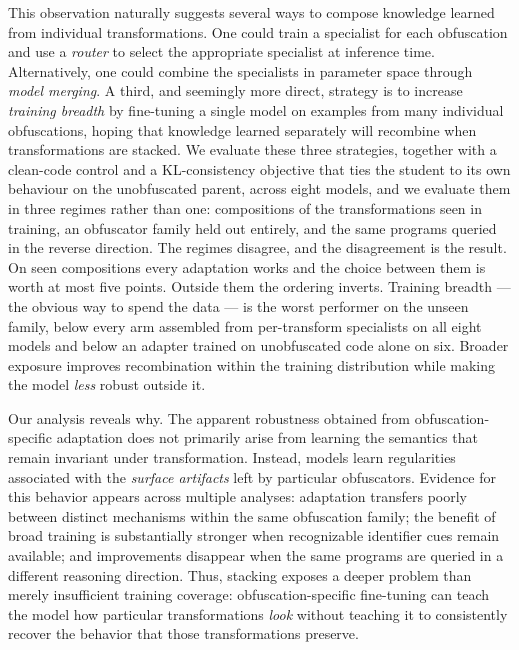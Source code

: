 This observation naturally suggests several ways to compose knowledge
learned from individual transformations. One could train a specialist
for each obfuscation and use a \emph{router} to select the appropriate
specialist at inference time. Alternatively, one could combine the
specialists in parameter space through \emph{model merging}. A third,
and seemingly more direct, strategy is to increase \emph{training
breadth} by fine-tuning a single model on examples from many individual
obfuscations, hoping that knowledge learned separately will recombine
when transformations are stacked. We evaluate these three strategies, together with a
clean-code control and a KL-consistency objective that ties the
student to its own behaviour on the unobfuscated parent, across eight
models, and we evaluate them in three regimes rather than one:
compositions of the transformations seen in training, an obfuscator
family held out entirely, and the same programs queried in the reverse
direction. The regimes disagree, and the disagreement is the result.
On seen compositions every adaptation works and the choice between
them is worth at most five points. Outside them the ordering inverts.
Training breadth --- the obvious way to spend the data --- is the worst
performer on the unseen family, below every arm assembled from
per-transform specialists on all eight models and below an adapter
trained on unobfuscated code alone on six. Broader exposure improves
recombination within the training distribution while making the model
\emph{less} robust outside it.

Our analysis reveals why. The apparent robustness obtained from
obfuscation-specific adaptation does not primarily arise from learning
the semantics that remain invariant under transformation. Instead,
models learn regularities associated with the \emph{surface artifacts}
left by particular obfuscators. Evidence for this behavior appears
across multiple analyses: adaptation transfers poorly between distinct
mechanisms within the same obfuscation family; the benefit of broad
training is substantially stronger when recognizable identifier cues
remain available; and improvements disappear when the same programs
are queried in a different reasoning direction. Thus, stacking exposes
a deeper problem than merely insufficient training coverage:
obfuscation-specific fine-tuning can teach the model how particular
transformations \emph{look} without teaching it to consistently recover
the behavior that those transformations preserve.

